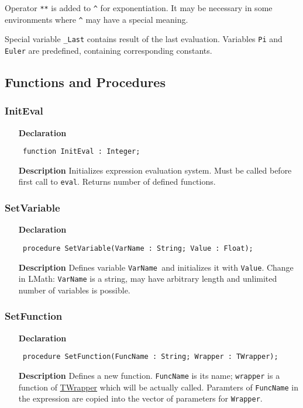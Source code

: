 \documentclass[12pt,a4paper,oneside]{report}
\newcommand{\lmath}[1]{   %
	\marginpar{\vspace{#1} 
		\begin{flushright}
			LMath
	\end{flushright} }
}
\newcommand{\declarationitem}[1]{\textbf{#1}}
\newcommand{\descriptiontitle}[1]{\textbf{#1}}
\newcommand{\code}[1]{\texttt{#1}}
\begin{document}
Operator \code{**} is added to \code{\^} for exponentiation. It may be necessary in some environments where \code{\^} may have a special meaning.

Special variable \code{\_Last} contains result of the last evaluation. Variables \code{Pi} and \code{Euler} are predefined, containing corresponding constants. 

\subsection{Functions and Procedures}
\subsubsection{InitEval}
\label{ueval-InitEval}
\begin{itemize}\item[\declarationitem{Declaration}\hfill]
	\begin{flushleft}
		\code{
			function InitEval : Integer;}
	\end{flushleft}
	\item[\descriptiontitle{Description}]
Initializes expression evaluation system. Must be called before first call to \code{eval}. Returns number of defined functions. 
\end{itemize}
\subsubsection{SetVariable}
\label{ueval-SetVariable}
 \lmath{-6pt}
\begin{itemize}\item[\declarationitem{Declaration}\hfill]
	\begin{flushleft}
		\code{
			procedure SetVariable(VarName : String; Value : Float);}
	\end{flushleft}
	\item[\descriptiontitle{Description}]
Defines variable \code{VarName }and initializes it with \code{Value}. Change in LMath: \code{VarName} is a string, may have arbitrary length and unlimited number of variables is possible. 
\end{itemize}
\subsubsection{SetFunction}
\label{ueval-SetFunction}
\begin{itemize}\item[\declarationitem{Declaration}\hfill]
	\begin{flushleft}
		\code{
			procedure SetFunction(FuncName : String; Wrapper : TWrapper);}
	\end{flushleft}
	\item[\descriptiontitle{Description}]
Defines a new function. \code{FuncName} is its name; \code{wrapper} is a function of \hyperref[utypes-TWrapper]{TWrapper} which will be actually called. Paramters of \code{FuncName} in the expression are copied into the vector of parameters for \code{Wrapper}. 
\end{itemize}
\end{document}
